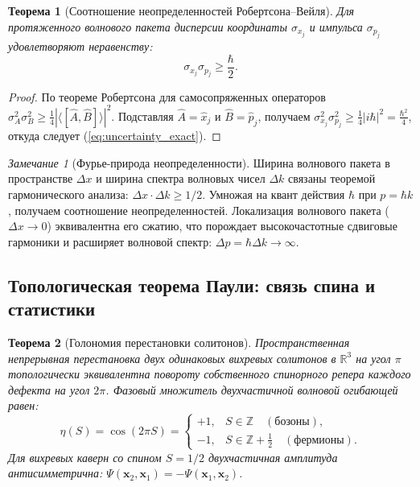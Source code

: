 \documentclass[11pt,a4paper]{article}
\newtheorem{theorem}{Теорема}
\theoremstyle{definition}
\theoremstyle{remark}
\newtheorem{remark}{Замечание}
\begin{document}
\begin{theorem}[Соотношение неопределенностей Робертсона--Вейля]
\label{thm:heisenberg_robertson_exact}
	Для протяженного волнового пакета дисперсии координаты $\sigma_{x_j}$ и импульса $\sigma_{p_j}$ удовлетворяют неравенству:
\begin{equation}
	\sigma_{x_j} \sigma_{p_j} \ge \frac{\hbar}{2}.
	\label{eq:uncertainty_exact}
\end{equation}
\end{theorem}
\begin{proof}
	По теореме Робертсона для самосопряженных операторов $\sigma_A^2 \sigma_B^2 \ge \frac{1}{4} | \langle [\hat{A}, \hat{B}] \rangle |^2$. Подставляя $\hat{A} = \hat{x}_j$ и $\hat{B} = \hat{p}_j$, получаем $\sigma_{x_j}^2 \sigma_{p_j}^2 \ge \frac{1}{4} | i\hbar |^2 = \frac{\hbar^2}{4}$, откуда следует (\ref{eq:uncertainty_exact}).
\end{proof}

\begin{remark}[Фурье-природа неопределенности]
	Ширина волнового пакета в пространстве $\Delta x$ и ширина спектра волновых чисел $\Delta k$ связаны теоремой гармонического анализа: $\Delta x \cdot \Delta k \ge 1/2$. Умножая на квант действия $\hbar$ при $p = \hbar k$, получаем соотношение неопределенностей. Локализация волнового пакета ($\Delta x \to 0$) эквивалентна его сжатию, что порождает высокочастотные сдвиговые гармоники и расширяет волновой спектр: $\Delta p = \hbar \Delta k \to \infty$.
\end{remark}

\subsection{Топологическая теорема Паули: связь спина и статистики}

\begin{theorem}[Голономия перестановки солитонов]
\label{thm:pauli_holonomy_exact}
	Пространственная непрерывная перестановка двух одинаковых вихревых солитонов в $\mathbb{R}^3$ на угол $\pi$ топологически эквивалентна повороту собственного спинорного репера каждого дефекта на угол $2\pi$. Фазовый множитель двухчастичной волновой огибающей равен:
\begin{equation}
	\eta(S) = \cos(2\pi S) = \begin{cases} +1, & S \in \mathbb{Z} \quad (\text{бозоны}), \\ -1, & S \in \mathbb{Z} + \frac{1}{2} \quad (\text{фермионы}). \end{cases}
\label{eq:spin_stat_factor}
\end{equation}
	Для вихревых каверн со спином $S = 1/2$ двухчастичная амплитуда антисимметрична: $\Psi(\mathbf{x}_2, \mathbf{x}_1) = -\Psi(\mathbf{x}_1, \mathbf{x}_2)$.
\end{theorem}
\end{document}
